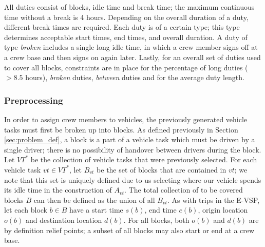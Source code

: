 \documentclass[]{article}
\begin{document}
All duties consist of blocks, idle time and break time; the maximum continuous time without a break is 4 hours. Depending on the overall duration of a duty, different break times are required. Each duty is of a certain type; this type determines acceptable start times, end times, and overall duration. A duty of type \textit{broken} includes a single long idle time, in which a crew member signs off at a crew base and then signs on again later. Lastly, for an overall set of duties used to cover all blocks, constraints are in place for the percentage of long duties ($>8.5$ hours), \textit{broken} duties, \textit{between} duties and for the average duty length.
\subsubsection{Preprocessing}
In order to assign crew members to vehicles, the previously generated vehicle tasks must first be broken up into blocks. As defined previously in Section \ref{sec:problem_def}, a block is a part of a vehicle task which must be driven by a single driver; there is no possibility of handover between drivers during the block. Let $VT^*$ be the collection of vehicle tasks that were previously selected. For each vehicle task $vt \in VT^*$, let $B_{vt}$ be the set of blocks that are contained in $vt$; we note that this set is uniquely defined due to us selecting where our vehicle spends its idle time in the construction of $A_{vt}$. The total collection of to be covered blocks $B$ can then be defined as the union of all $B_{vt}$. As with trips in the E-VSP, let each block $b \in B$ have a start time $s(b)$, end time $e(b)$, origin location $o(b)$ and destination location $d(b)$. For all blocks, both $o(b)$ and $d(b)$ are by definition relief points; a subset of all blocks may also start or end at a crew base.
\end{document}
